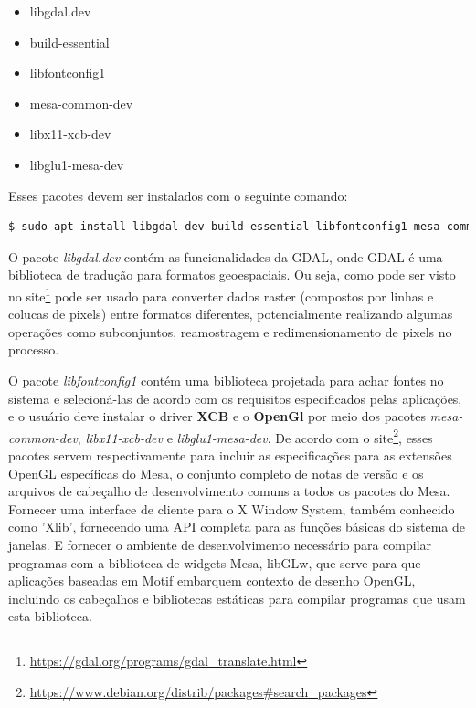 \begin{itemize}
   	\item libgdal.dev
   	\item build-essential
   	\item libfontconfig1
   	\item mesa-common-dev
   	\item libx11-xcb-dev
   	\item libglu1-mesa-dev
\end{itemize}
Esses pacotes devem ser instalados com o seguinte comando: 
\begin{lstlisting}[language=bash]
	$ sudo apt install libgdal-dev build-essential libfontconfig1 mesa-common-dev libx11-xcb-dev libglu1-mesa-dev
\end{lstlisting}				
	
O pacote \textit{libgdal.dev} contém as funcionalidades da GDAL, onde GDAL é uma biblioteca de tradução para formatos geoespaciais. Ou seja, como pode ser visto no site\footnote{\url{https://gdal.org/programs/gdal_translate.html}} pode ser usado para converter dados raster (compostos por linhas e colucas de pixels) entre formatos diferentes, potencialmente realizando algumas operações como subconjuntos, reamostragem e redimensionamento de pixels no processo.

O pacote \textit{libfontconfig1} contém uma biblioteca projetada para achar fontes no sistema e selecioná-las de acordo com os requisitos especificados pelas aplicações, e o usuário deve instalar o driver \textbf{XCB} e o \textbf{OpenGl} por meio dos pacotes \textit{mesa-common-dev}, \textit{libx11-xcb-dev} e \textit{libglu1-mesa-dev}. De acordo com o site\footnote{\url{https://www.debian.org/distrib/packages\#search\_packages}}, %
esses pacotes servem respectivamente para incluir as especificações para as extensões OpenGL específicas do Mesa, o conjunto completo de notas de versão e os arquivos de cabeçalho de desenvolvimento comuns a todos os pacotes do Mesa. Fornecer %
 uma interface de cliente para o X Window System, também conhecido como 'Xlib', fornecendo uma API completa para as funções básicas do sistema de janelas. E %
  fornecer o ambiente de desenvolvimento necessário para compilar programas com a biblioteca de widgets Mesa, libGLw, que serve para que aplicações baseadas em Motif embarquem contexto de desenho OpenGL, incluindo os cabeçalhos e bibliotecas estáticas para compilar programas que usam esta biblioteca.
  
